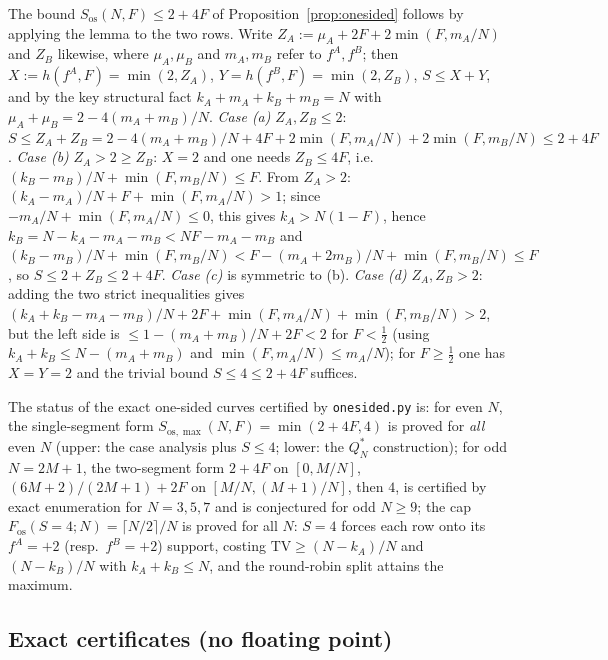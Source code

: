 \documentclass[aps,pra,reprint,superscriptaddress,floatfix]{revtex4-2}
\newcommand{\TV}{\mathrm{TV}}
\begin{document}
The bound $S_{\mathrm{os}}(N,F)\le2+4F$ of Proposition~\ref{prop:onesided}
follows by applying the lemma to the two rows. Write
$Z_A:=\mu_A+2F+2\min(F,m_A/N)$ and $Z_B$ likewise, where $\mu_A,\mu_B$ and
$m_A,m_B$ refer to $f^A,f^B$; then $X:=h(f^A,F)=\min(2,Z_A)$,
$Y=h(f^B,F)=\min(2,Z_B)$, $S\le X+Y$, and by the key structural fact
$k_A+m_A+k_B+m_B=N$ with $\mu_A+\mu_B=2-4(m_A+m_B)/N$.
\emph{Case (a)} $Z_A,Z_B\le2$:
$S\le Z_A+Z_B=2-4(m_A+m_B)/N+4F+2\min(F,m_A/N)+2\min(F,m_B/N)
\le2+4F$.
\emph{Case (b)} $Z_A>2\ge Z_B$: $X=2$ and one needs $Z_B\le4F$, i.e.\
$(k_B-m_B)/N+\min(F,m_B/N)\le F$. From $Z_A>2$:
$(k_A-m_A)/N+F+\min(F,m_A/N)>1$; since
$-m_A/N+\min(F,m_A/N)\le0$, this gives $k_A>N(1-F)$, hence
$k_B=N-k_A-m_A-m_B<NF-m_A-m_B$ and
$(k_B-m_B)/N+\min(F,m_B/N)<F-(m_A+2m_B)/N+\min(F,m_B/N)\le F$, so
$S\le2+Z_B\le2+4F$.
\emph{Case (c)} is symmetric to (b).
\emph{Case (d)} $Z_A,Z_B>2$: adding the two strict inequalities gives
$(k_A+k_B-m_A-m_B)/N+2F+\min(F,m_A/N)+\min(F,m_B/N)>2$, but the left side
is $\le1-(m_A+m_B)/N+2F<2$ for $F<\tfrac12$ (using
$k_A+k_B\le N-(m_A+m_B)$ and $\min(F,m_A/N)\le m_A/N$); for
$F\ge\tfrac12$ one has $X=Y=2$ and the trivial bound $S\le4\le2+4F$
suffices.

The status of the exact one-sided curves certified by
\texttt{onesided.py} is: for even $N$, the single-segment form
$S_{\mathrm{os},\max}(N,F)=\min(2+4F,4)$ is proved for \emph{all} even
$N$ (upper: the case analysis plus $S\le4$; lower: the $Q^*_N$
construction); for odd $N=2M+1$, the two-segment form $2+4F$ on
$[0,M/N]$, $(6M+2)/(2M+1)+2F$ on $[M/N,(M+1)/N]$, then $4$, is certified
by exact enumeration for $N=3,5,7$ and is conjectured for odd $N\ge9$;
the cap $F_{\mathrm{os}}(S{=}4;N)=\lceil N/2\rceil/N$ is proved for all
$N$: $S=4$ forces each row onto its $f^A{=}{+}2$ (resp.\
$f^B{=}{+}2$) support, costing $\TV\ge(N-k_A)/N$ and $(N-k_B)/N$ with
$k_A+k_B\le N$, and the round-robin split attains the maximum.

\subsection{Exact certificates (no floating point)}
\end{document}
